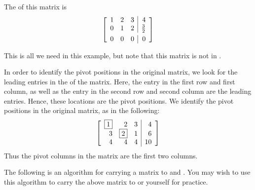 \begin{solution} 
The \ef \;of this matrix is
\begin{equation*}
\leftB
\begin{array}{rrr|r}
1 & 2 & 3 & 4 \\
0 & 1 & 2 & \vspace{0.05in}\frac{3}{2} \\
0 & 0 & 0 & 0
\end{array}
\rightB
\end{equation*}


This is all we need in this example, but note that this matrix is not in \rref.

In order to identify the pivot positions in the original matrix, we look for the leading entries in the \ef \hspace{0.5mm} of the matrix. 
Here, the entry in the first row and first column, as well as the entry in the second row and second column 
are the leading entries. Hence, these locations are the pivot positions. We identify the pivot positions in the original matrix, 
as in the following:\
\begin{equation*}
\left[
\begin{array}{rrr|r}
\fbox{1} & 2 & 3 & 4 \\
3 & \fbox{2} & 1 & 6 \\
4 & 4 & 4 & 10
\end{array}
\right]
\end{equation*}
Thus the pivot columns in the matrix are the first two columns. 
\end{solution}

The following is an algorithm for carrying a matrix
to \ef \;and \rref. You may wish to use this algorithm to carry the above matrix to \ef \;or \rref \;yourself for practice. 

